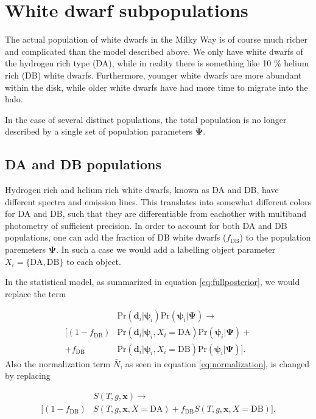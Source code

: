 \documentclass[fleqn,usenatbib]{mnras}
\newcommand{\popp}{\boldsymbol{\Psi}}
\newcommand{\objp}{\boldsymbol{\psi}}
\newcommand{\data}{\mathbf{d}}
\newcommand{\Teff}{T}
\newcommand{\logg}{g}
\newcommand{\pr}{\text{Pr}}
\begin{document}
\section{White dwarf subpopulations}

The actual population of white dwarfs in the Milky Way is of course much richer and complicated than the model described above. We only have white dwarfs of the hydrogen rich type (DA), while in reality there is something like 10 \% helium rich (DB) white dwarfs. Furthermore, younger white dwarfs are more abundant within the disk, while older white dwarfs have had more time to migrate into the halo.

In the case of several distinct populations, the total population is no longer described by a single set of population parameters $\popp$.






\subsection{DA and DB populations}

Hydrogen rich and helium rich white dwarfs, known as DA and DB, have different spectra and emission lines. This translates into somewhat different colors for DA and DB, such that they are differentiable from eachother with multiband photometry of sufficient precision. In order to account for both DA and DB populations, one can add the fraction of DB white dwarfs ($f_\text{DB}$) to the population paremeters $\popp$. In such a case we would add a labelling object parameter $X_i = \{\text{DA},\text{DB}\}$ to each object.

In the statistical model, as summarized in equation \eqref{eq:fullposterior}, we would replace the term

\begin{equation}
\begin{split}
	& \pr(\data_i | \objp_i) \pr(\objp_i | \popp)
	\rightarrow \\
	\Big[
	(1-f_\text{DB}) & \pr(\data_i | \objp_i,X_i=\text{DA}) \pr(\objp_i | \popp) + \\
	+ f_\text{DB} & \pr(\data_i | \objp_i,X_i=\text{DB}) \pr(\objp_i | \popp)
	\Big].
\end{split}
\end{equation}
Also the normalization term $\bar{N}$, as seen in equation \eqref{eq:normalization}, is changed by replacing

\begin{equation}
\begin{split}
	& S(\Teff,\logg,\mathbf{x}) \rightarrow \\
	\Big[
	 (1-f_\text{DB}) & S(\Teff,\logg,\mathbf{x},X=\text{DA})
	 + f_\text{DB} S(\Teff,\logg,\mathbf{x},X=\text{DB})
	 \Big].
\end{split}
\end{equation}
\end{document}
